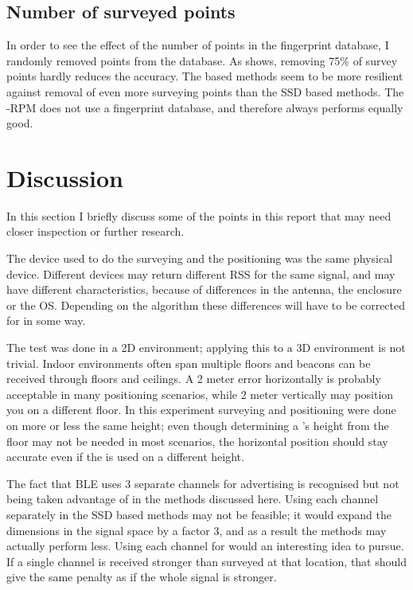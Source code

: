 \subsection{Number of surveyed points}
In order to see the effect of the number of points in the fingerprint database, I randomly removed points from the database.
As  shows, removing 75\% of survey points hardly reduces the accuracy.
The \aBRP based methods seem to be more resilient against removal of even more surveying points than the SSD based methods.
The \aBRP-RPM does not use a fingerprint database, and therefore always performs equally good.

\section{Discussion}
In this section I briefly discuss some of the points in this report that may need closer inspection or further research.

The device used to do the surveying and the positioning was the same physical device.
Different devices may return different RSS for the same signal, and may have different characteristics, because of differences in the antenna, the enclosure or the OS.
Depending on the algorithm these differences will have to be corrected for in some way.

The test was done in a 2D environment; applying this to a 3D environment is not trivial.
Indoor environments often span multiple floors and beacons can be received through floors and ceilings.
A 2 meter error horizontally is probably acceptable in many positioning scenarios, while 2 meter vertically may position you on a different floor.
In this experiment surveying and positioning were done on more or less the same height; even though determining a \device's height from the floor may not be needed in most scenarios, the horizontal position should stay accurate even if the \device is used on a different height.

The fact that BLE uses 3 separate channels for advertising is recognised but not being taken advantage of in the methods discussed here.
Using each channel separately in the SSD based methods may not be feasible; it would expand the dimensions in the signal space by a factor 3, and as a result the methods may actually perform less.
Using each channel for \aBRP would an interesting idea to pursue.
If a single channel is received stronger than surveyed at that location, that should give the same penalty as if the whole signal is stronger.

